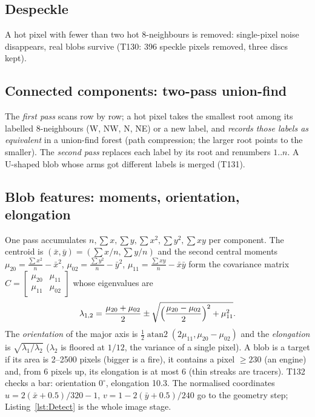 \subsection{Despeckle}
A hot pixel with fewer than two hot 8-neighbours is removed: single-pixel noise disappears, real blobs survive (T130: 396 speckle pixels removed, three discs kept).
\lstDespeckle

\subsection{Connected components: two-pass union-find}
The \emph{first pass} scans row by row; a hot pixel takes the smallest root among its labelled 8-neighbours (W, NW, N, NE) or a new label, and
\emph{records those labels as equivalent} in a union-find forest (path compression; the larger root points to the smaller). The \emph{second pass} replaces each label by its root and renumbers $1..n$. A U-shaped blob whose arms got different labels is merged (T131).
\lstLabel

\subsection{Blob features: moments, orientation, elongation}
One pass accumulates $n,\sum x,\sum y,\sum x^2,\sum y^2,\sum xy$ per component. The centroid is $(\bar x,\bar y)=(\sum x/n,\sum y/n)$ and the second central moments
$\mu_{20}=\frac{\sum x^2}{n}-\bar x^2$, $\mu_{02}=\frac{\sum y^2}{n}-\bar y^2$, $\mu_{11}=\frac{\sum xy}{n}-\bar x\bar y$ form the covariance matrix $C=\begin{bmatrix}\mu_{20}&\mu_{11}\\\mu_{11}&\mu_{02}\end{bmatrix}$ whose eigenvalues are
\begin{equation}\lambda_{1,2}=\frac{\mu_{20}+\mu_{02}}{2}\pm\sqrt{\Bigl(\frac{\mu_{20}-\mu_{02}}{2}\Bigr)^2+\mu_{11}^2}.\end{equation}
The \emph{orientation} of the major axis is $\tfrac12\operatorname{atan2}(2\mu_{11},\mu_{20}-\mu_{02})$ and the \emph{elongation} is $\sqrt{\lambda_1/\lambda_2}$ ($\lambda_2$ is floored at $1/12$, the variance of a single pixel). A blob is a target if its area is 2--2500 pixels (bigger is a fire), it contains a pixel $\ge230$ (an engine) and, from 6 pixels up, its elongation is at most 6 (thin streaks are tracers). T132 checks a bar: orientation $0^\circ$, elongation 10.3. The normalised coordinates
$u=2(\bar x+0.5)/320-1$, $v=1-2(\bar y+0.5)/240$ go to the geometry step; Listing~\ref{lst:Detect} is the whole image stage.
\lstDetect

